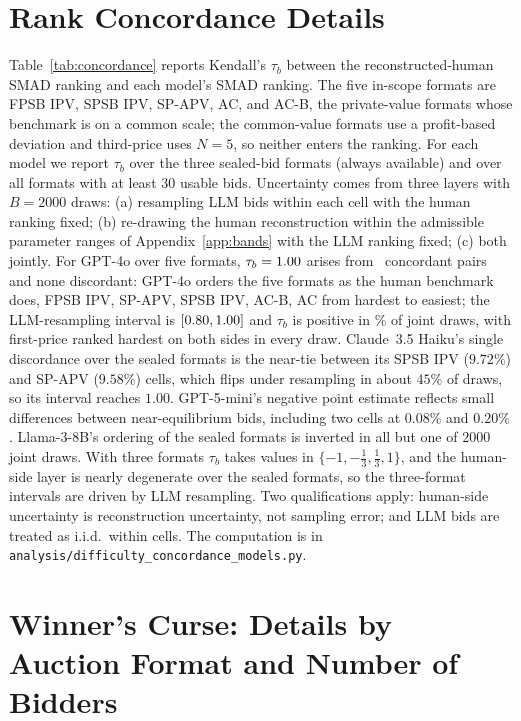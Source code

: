 \documentclass[acmsmall,screen,review]{acmart}
\newcommand{\rev}[1]{{\color{blue}#1}}
\newcommand{\rev}[1]{#1}
\begin{document}
\newpage

\section{\texorpdfstring{Rank Concordance Details}{Rank Concordance Details}}\label{app:concordance}

Table~\ref{tab:concordance} reports Kendall's $\tau_b$ between the reconstructed-human SMAD ranking and each model's SMAD ranking. The five in-scope formats are FPSB IPV, SPSB IPV, SP-APV, AC, and AC-B, the private-value formats whose benchmark is on a common scale; the common-value formats use a profit-based deviation and third-price uses $N=5$, so neither enters the ranking. For each model we report $\tau_b$ over the three sealed-bid formats (always available) and over all formats with at least 30 usable bids. Uncertainty comes from three layers with $B=2000$ draws: (a) resampling LLM bids within each cell with the human ranking fixed; (b) re-drawing the human reconstruction within the admissible parameter ranges of Appendix~\ref{app:bands} with the LLM ranking fixed; (c) both jointly. \rev{For GPT-4o over five formats, $\tau_b = 1.00$ arises from \TauFiveConc\ concordant pairs and none discordant: GPT-4o orders the five formats as the human benchmark does, FPSB IPV, SP-APV, SPSB IPV, AC-B, AC from hardest to easiest; the LLM-resampling interval is $[0.80, 1.00]$ and $\tau_b$ is positive in \TauFivePGpt\% of joint draws,} with first-price ranked hardest on both sides in every draw. Claude~3.5 Haiku's single discordance over the sealed formats is the near-tie between its SPSB IPV ($9.72\%$) and SP-APV ($9.58\%$) cells, which flips under resampling in about $45\%$ of draws, so its interval reaches $1.00$. GPT-5-mini's negative point estimate reflects small differences between near-equilibrium bids, including two cells at $0.08\%$ and $0.20\%$. Llama-3-8B's ordering \rev{of the sealed formats} is inverted in all but one of $2000$ joint draws. With three formats $\tau_b$ takes values in $\{-1, -\tfrac13, \tfrac13, 1\}$, and the human-side layer is nearly degenerate over the sealed formats, so the three-format intervals are driven by LLM resampling. Two qualifications apply: human-side uncertainty is reconstruction uncertainty, not sampling error; and LLM bids are treated as i.i.d.\ within cells. The computation is in \texttt{analysis/difficulty\_concordance\_models.py}.


\section{\texorpdfstring{Winner's Curse: Details by Auction Format and Number of Bidders}{Winner's Curse: Details by Auction Format and Number of Bidders}}\label{app:winners_curse}
\end{document}
